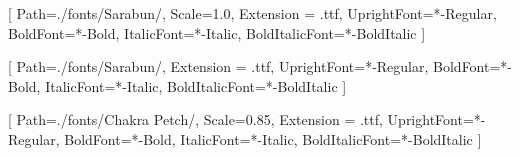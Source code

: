 
% 
% 


\setsansfont{Sarabun}[
    Path=./fonts/Sarabun/,
    Scale=1.0,
    Extension = .ttf,
    UprightFont=*-Regular,
    BoldFont=*-Bold,
    ItalicFont=*-Italic,
    BoldItalicFont=*-BoldItalic
    ]

[
    Path=./fonts/Sarabun/,
    Extension = .ttf,
    UprightFont=*-Regular,
    BoldFont=*-Bold,
    ItalicFont=*-Italic,
    BoldItalicFont=*-BoldItalic
    ]


\setmonofont{ChakraPetch}[
    Path=./fonts/Chakra Petch/,
    Scale=0.85,
    Extension = .ttf,
    UprightFont=*-Regular,
    BoldFont=*-Bold,
    ItalicFont=*-Italic,
    BoldItalicFont=*-BoldItalic
    ]